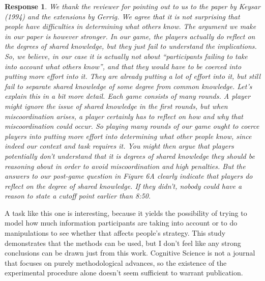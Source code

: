 \documentclass[a4paper]{article}
\newtheorem{response}{Response}
\begin{document}
\begin{response}
We thank the reviewer for pointing out to us to the paper by Keysar (1994) and the extensions by Gerrig. We agree that it is not surprising that people have difficulties in determining what others know. The argument we make in our paper is however stronger. In our game, the players actually \emph{do} reflect on the degrees of shared knowledge, but they just fail to understand the implications. So, we believe, in our case it is actually not about ``participants failing to take into account what others know'', and that they would have to be coerced into putting more effort into it. They are already putting a lot of effort into it, but still fail to separate shared knowledge of some degree from common knowledge. Let's explain this in a bit more detail. Each game consists of many rounds. A player might ignore the issue of shared knowledge in the first rounds, but when miscoordination arises, a player certainly has to reflect on how and why that miscoordination could occur. So playing many rounds of our game ought to coerce players into putting more effort into determining what other people know, since indeed our context and task requires it. You might then argue that players potentially don't understand that it is degrees of shared knowledge they should be reasoning about in order to avoid miscoordination and high penalties. But the answers to our post-game question in Figure 6A clearly indicate that players \emph{do} reflect on the degree of shared knowledge. If they didn't, nobody could have a reason to state a cutoff point earlier than 8:50.
\end{response}

A task like this one is interesting, because it yields the possibility of trying to model how much information participants are taking into account or to do manipulations to see whether that affects people's strategy. This study demonstrates that the methods can be used, but I don't feel like any strong conclusions can be drawn just from this work. Cognitive Science is not a journal that focuses on purely methodological advances, so the existence of the experimental procedure alone doesn't seem sufficient to warrant publication.
\end{document}
